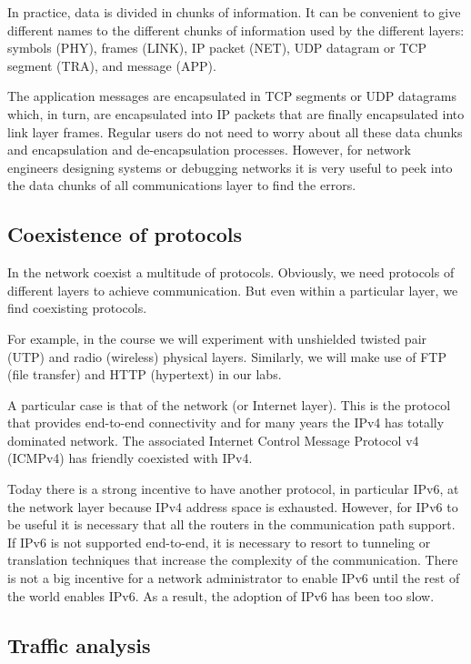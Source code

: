 In practice, data is divided in chunks of information.
It can be convenient to give different names to the different chunks of information used by the different layers: symbols (PHY), frames (LINK), IP packet (NET), UDP datagram or TCP segment (TRA), and message (APP).

The application messages are encapsulated in TCP segments or UDP datagrams which, in turn, are encapsulated into IP packets that are finally encapsulated into link layer frames.
Regular users do not need to worry about all these data chunks and encapsulation and de-encapsulation processes.
However, for network engineers designing systems or debugging networks it is very useful to peek into the data chunks of all communications layer to find the errors.

\subsection{Coexistence of protocols}

In the network coexist a multitude of protocols.
Obviously, we need protocols of different layers to achieve communication.
But even within a particular layer, we find coexisting protocols.

For example, in the course we will experiment with unshielded twisted pair (UTP) and radio (wireless) physical layers.
Similarly, we will make use of FTP (file transfer) and HTTP (hypertext) in our labs.

A particular case is that of the network (or Internet layer).
This is the protocol that provides end-to-end connectivity and for many years the IPv4 has totally dominated network.
The associated Internet Control Message Protocol v4 (ICMPv4) has friendly coexisted with IPv4.

Today there is a strong incentive to have another protocol, in particular IPv6, at the network layer because IPv4 address space is exhausted.
However, for IPv6 to be useful it is necessary that all the routers in the communication path support.
If IPv6 is not supported end-to-end, it is necessary to resort to tunneling or translation techniques that increase the complexity of the communication.
There is not a big incentive for a network administrator to enable IPv6 until the rest of the world enables IPv6.
As a result, the adoption of IPv6 has been too slow.

\subsection{Traffic analysis}

